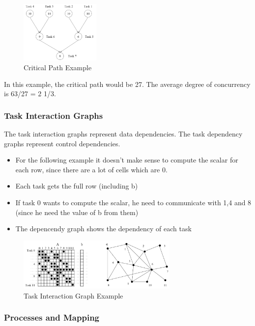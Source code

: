\begin{figure}[H]
\centering
\includegraphics[width=0.35\textwidth]{figures/criticalPathExample.png}
\caption{Critical Path Example}
\end{figure}

In this example, the critical path would be 27. The average degree of
concurrency is 63/27 = 2 1/3.

\clearpage
\hypertarget{task-interaction-graphs}{%
\subsubsection{Task Interaction Graphs}\label{task-interaction-graphs}}

The task interaction graphs represent data dependencies. The task
dependency graphs represent control dependencies.

\begin{itemize}
\tightlist
\item
  For the following example it doesn't make sense to compute the scalar
  for each row, since there are a lot of cells which are 0.
\item
  Each task gets the full row (including b)
\item
  If task 0 wants to compute the scalar, he need to communicate with 1,4
  and 8 (since he need the value of b from them)
\item
  The depencendy graph shows the dependency of each task
\end{itemize}

\begin{figure}[H]
\centering
\includegraphics[width=0.7\textwidth]{figures/taskInteractionGraph.png}
\caption{Task Interaction Graph Example}
\end{figure}

\hypertarget{processes-and-mapping}{%
\subsubsection{Processes and Mapping}\label{processes-and-mapping}}

